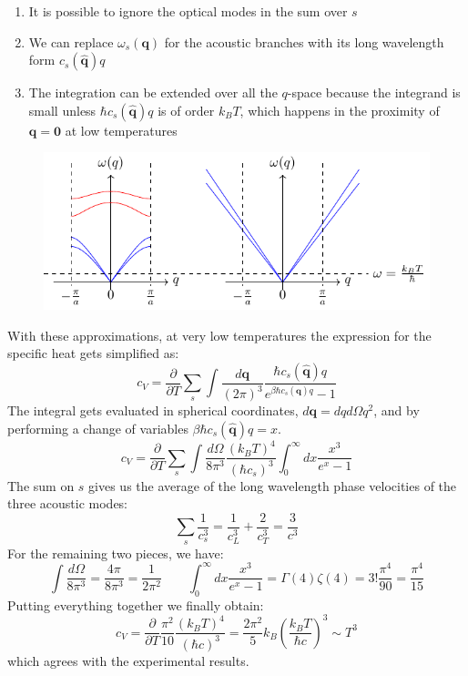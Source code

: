 \documentclass[10.75pt,a4paper,openright,bottom=2cm]{article}
\renewcommand{\Vec}[1]{\boldsymbol{#1}}
\begin{document}
\begin{enumerate}
    \item It is possible to ignore the optical modes in the sum over $s$
    \item We can replace $\omega_s(\Vec{q})$ for the acoustic branches with its long wavelength form $c_s(\hat{\Vec{q}})q$
    \item The integration can be extended over all the $q$-space because the integrand is small unless $\hbar c_s(\hat{\Vec{q}})q$ is of order $k_BT$, which happens in the proximity of $\Vec{q}=\Vec{0}$ at low temperatures
\end{enumerate}
\begin{figure}[h]
    \centering
    \includegraphics{simplifications.pdf}
    \label{fig:simplifications}
\end{figure}
With these approximations, at very low temperatures the expression for the specific heat gets simplified as:
\[
c_V=\frac{\partial}{\partial T}\sum_s\int\frac{d\Vec{q}}{(2\pi)^3}\frac{\hbar c_s(\hat{\Vec{q}})q}{e^{\beta\hbar c_s(\hat{\Vec{q}})q}-1}
\]
The integral gets evaluated in spherical coordinates, $d\Vec{q}=dqd\Omega q^2$, and by performing a change of variables $\beta\hbar c_s(\hat{\Vec{q}})q=x$.
\[
c_V=\frac{\partial}{\partial T}\sum_s\int\frac{d\Omega}{8\pi^3}\frac{(k_BT)^4}{(\hbar c_s)^3}\int_0^\infty dx\frac{x^3}{e^x-1}
\]
The sum on $s$ gives us the average of the long wavelength phase velocities of the three acoustic modes:
\[
\sum_s\frac{1}{c_s^3}=\frac{1}{c_L^3}+\frac{2}{c_T^3}=\frac{3}{c^3}
\]
For the remaining two pieces, we have:
\[
\int\frac{d\Omega}{8\pi^3}=\frac{4\pi}{8\pi^3}=\frac{1}{2\pi^2} \qquad \int_0^\infty dx\frac{x^3}{e^x-1}=\Gamma(4)\zeta(4)=3!\frac{\pi^4}{90}=\frac{\pi^4}{15}
\]
Putting everything together we finally obtain:
\[
c_V=\frac{\partial}{\partial T}\frac{\pi^2}{10}\frac{(k_BT)^4}{(\hbar c)^3}=\frac{2\pi^2}{5}k_B\left(\frac{k_BT}{\hbar c}\right)^3\sim T^3
\]
which agrees with the experimental results.
\end{document}

